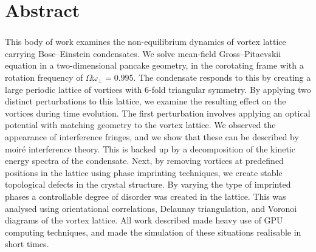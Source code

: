 \chapter*{Abstract}
\subsection*{\thesistitle}
\iffalse
Maximum 400 words, not to exceed one A4 page.

No figures or tables.  No references.  Just aims, brief methods, results, brief conclusions.

Avoid over-detailed technical method descriptions.

Should be readable to a literate science reader familiar with your general area, but not necessarily experts-only material

This will be published online within 3 months of award of the degree, as a minimum.  The entire thesis must be published within one year, unless restrictions apply (as above).
\fi
This body of work examines the non-equilibrium dynamics of vortex lattice carrying Bose--Einstein condensates. We solve mean-field Gross--Pitaevskii equation in a two-dimensional pancake geometry, in the corotating frame with a rotation frequency of $\Omega\omega_\perp=0.995$. The condensate responds to this by creating a large periodic lattice of vortices with 6-fold triangular symmetry. By applying two distinct perturbations to this lattice, we examine the resulting effect on the vortices during time evolution. The first perturbation involves applying an optical potential with matching geometry to the vortex lattice. We observed the appearance of interference fringes, and we show that these can be described by moir\'e interference theory. This is backed up by a decomposition of the kinetic energy spectra of the condensate. Next, by removing vortices at predefined positions in the lattice using phase imprinting techniques, we create stable topological defects in the crystal structure. By varying the type of imprinted phases a controllable degree of disorder was created in the lattice. This was analysed using orientational correlations, Delaunay triangulation, and Voronoi diagrams of the vortex lattice. All work described made heavy use of GPU computing techniques, and made the simulation of these situations realisable in short times.
